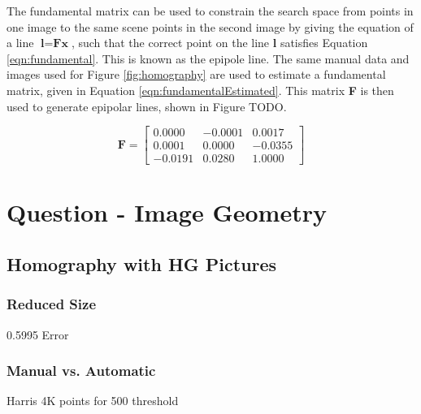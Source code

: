 \documentclass[a4paper, 10pt, conference]{ieeeconf}
\begin{document}

The fundamental matrix can be used to constrain the search space from points in one image to the same scene points in the second image by giving the equation of a line $\textbf{l}=\textbf{Fx}$, such that the correct point on the line \textbf{l} satisfies Equation \ref{eqn:fundamental}. This is known as the epipole line. The same manual data and images used for Figure \ref{fig:homography} are used to estimate a fundamental matrix, given in Equation \ref{eqn:fundamentalEstimated}. This matrix \textbf{F} is then used to generate epipolar lines, shown in Figure TODO.

\begin{equation} \label{eqn:fundamentalEstimated}
\textbf{F} = \begin{bmatrix}
     0.0000 & -0.0001 &  0.0017 \\
     0.0001 &  0.0000 & -0.0355 \\
    -0.0191 &  0.0280 &  1.0000
\end{bmatrix}
\end{equation}



\section{Question - Image Geometry}
\subsection{Homography with HG Pictures}
\subsubsection{Reduced Size}
0.5995 Error
\subsubsection{Manual vs. Automatic}
Harris 4K points for 500 threshold
\end{document}
